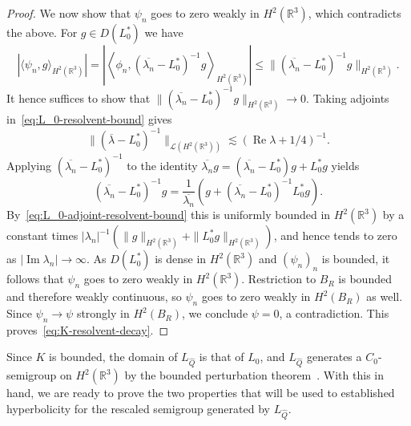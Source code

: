 \documentclass[11pt]{article}
\DeclareMathOperator{\real}{Re}
\DeclareMathOperator{\imag}{Im}
\newcommand{\conj}[1]{\overline{#1}}
\begin{document}
\begin{proof}
  We now show that \(\psi_{n}\) goes to zero weakly in
  \(H^{2}(\mathbb{R}^{3})\), which contradicts the above. For
  \(g \in D(L_{0}^{*})\) we have
  \begin{equation*}
    |\langle \psi_{n}, g\rangle_{H^{2}(\mathbb{R}^{3})}|
    = \left|\left\langle \phi_{n}, (\conj{\lambda_{n}} - L_{0}^{*})^{-1}g\right\rangle_{H^{2}(\mathbb{R}^{3})}\right|
    \leq \|(\conj{\lambda_{n}} - L_{0}^{*})^{-1}g\|_{H^{2}(\mathbb{R}^{3})}.
  \end{equation*}
  It hence suffices to show that
  \(\|(\conj{\lambda_{n}} - L_{0}^{*})^{-1}g\|_{H^{2}(\mathbb{R}^{3})}
  \to 0\). Taking adjoints in~\eqref{eq:L_0-resolvent-bound} gives
  \begin{equation}\label{eq:L_0-adjoint-resolvent-bound}
    \|(\conj{\lambda} - L_{0}^{*})^{-1}\|_{\mathcal{L}(H^{2}(\mathbb{R}^{3}))}
    \lesssim (\real \lambda + 1/4)^{-1}.
  \end{equation}
  Applying \((\conj{\lambda_{n}} - L_{0}^{*})^{-1}\) to the
  identity
  \(\conj{\lambda_{n}} g = (\conj{\lambda_{n}} - L_{0}^{*})g +
  L_{0}^{*}g\) yields
  \begin{equation*}
    (\conj{\lambda_{n}} - L_{0}^{*})^{-1}g
    = \frac{1}{\conj{\lambda_{n}}}\left(
      g + (\conj{\lambda_{n}} - L_{0}^{*})^{-1}L_{0}^{*}g
    \right).
  \end{equation*}
  By~\eqref{eq:L_0-adjoint-resolvent-bound} this is uniformly bounded
  in \(H^{2}(\mathbb{R}^{3})\) by a constant times
  \(|\lambda_{n}|^{-1}\left(\|g\|_{H^{2}(\mathbb{R}^{3})} +
    \|L_{0}^{*}g\|_{H^{2}(\mathbb{R}^{3})}\right)\), and hence tends
  to zero as \(|\imag \lambda_{n}| \to \infty\). As \(D(L_{0}^{*})\)
  is dense in \(H^{2}(\mathbb{R}^{3})\) and \((\psi_{n})_{n}\) is
  bounded, it follows that \(\psi_{n}\) goes to zero weakly in
  \(H^{2}(\mathbb{R}^{3})\). Restriction to \(B_{R}\) is bounded and
  therefore weakly continuous, so \(\psi_{n}\) goes to zero weakly in
  \(H^{2}(B_{R})\) as well. Since \(\psi_{n} \to \psi\) strongly in
  \(H^{2}(B_{R})\), we conclude \(\psi = 0\), a contradiction. This
  proves~\eqref{eq:K-resolvent-decay}.
\end{proof}

Since \(K\) is bounded, the domain of \(L_{\hat{Q}}\) is that of
\(L_{0}\), and \(L_{\hat{Q}}\) generates a \(C_{0}\)-semigroup on
\(H^{2}(\mathbb{R}^{3})\) by the bounded perturbation
theorem~\cite[Chapter~III, Theorem~1.3]{Engel2000}. With this in hand,
we are ready to prove the two properties that will be used to
established hyperbolicity for the rescaled semigroup generated by
\(L_{\hat{Q}}\).
\end{document}
